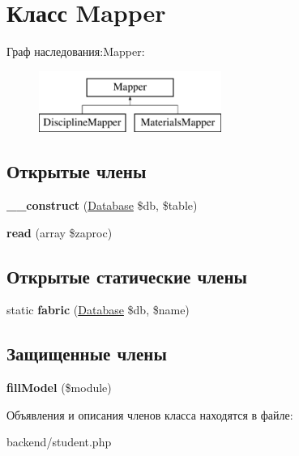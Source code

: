 \hypertarget{classMapper}{}\section{Класс Mapper}
\label{classMapper}
Граф наследования\+:Mapper\+:\begin{figure}[H]
\begin{center}
\leavevmode
\includegraphics[height=2.000000cm]{classMapper}
\end{center}
\end{figure}
\subsection*{Открытые члены}
\begin{DoxyCompactItemize}
\item 
\hypertarget{classMapper_ac57073adb354fedfc5397e3ffb029cf1}{}{\bfseries \+\_\+\+\_\+construct} (\hyperlink{classDatabase}{Database} \$db, \$table)\label{classMapper_ac57073adb354fedfc5397e3ffb029cf1}

\item 
\hypertarget{classMapper_a3690aa0032657dfa1c22d6b40fa6c689}{}{\bfseries read} (array \$zaproc)\label{classMapper_a3690aa0032657dfa1c22d6b40fa6c689}

\end{DoxyCompactItemize}
\subsection*{Открытые статические члены}
\begin{DoxyCompactItemize}
\item 
\hypertarget{classMapper_a0d08e8a60d7614c31a3ab5891ed4f73f}{}static {\bfseries fabric} (\hyperlink{classDatabase}{Database} \$db, \$name)\label{classMapper_a0d08e8a60d7614c31a3ab5891ed4f73f}

\end{DoxyCompactItemize}
\subsection*{Защищенные члены}
\begin{DoxyCompactItemize}
\item 
\hypertarget{classMapper_a998edf9bcef41624c8a1ccc7de78bbaf}{}{\bfseries fill\+Model} (\$module)\label{classMapper_a998edf9bcef41624c8a1ccc7de78bbaf}

\end{DoxyCompactItemize}


Объявления и описания членов класса находятся в файле\+:\begin{DoxyCompactItemize}
\item 
backend/student.\+php\end{DoxyCompactItemize}
